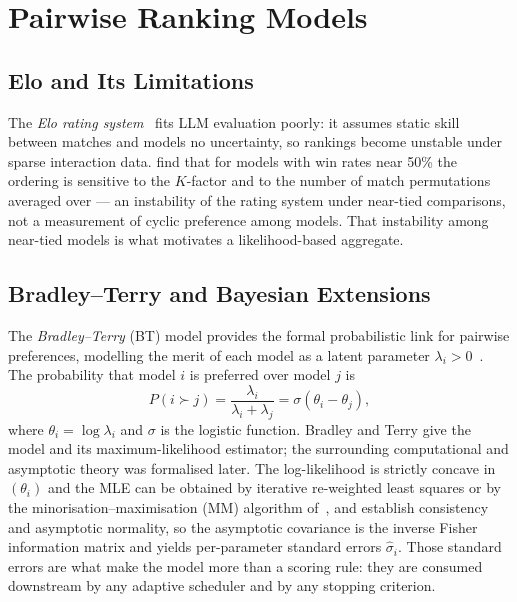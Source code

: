 \section{Pairwise Ranking Models}\label{sec:ranking-models}

\subsection*{Elo and Its Limitations}

The \textit{Elo rating system}~\parencite{elo1978rating} fits LLM
evaluation poorly: it assumes static skill between matches and models
no uncertainty, so rankings become unstable under sparse interaction
data. \textcite{boubdir2024elo} find that for models with win rates
near 50\% the ordering is sensitive to the $K$-factor and to the
number of match permutations averaged over --- an instability of the
rating system under near-tied comparisons, not a measurement of
cyclic preference among models. That instability among near-tied
models is what motivates a likelihood-based aggregate.

\subsection*{Bradley--Terry and Bayesian Extensions}

The \textit{Bradley--Terry} (BT) model provides the formal
probabilistic link for pairwise preferences, modelling the merit of
each model as a latent parameter
$\lambda_i > 0$~\parencite{bradley1952rank}. The probability that
model $i$ is preferred over model $j$ is
\begin{equation}
    P(i \succ j) = \frac{\lambda_i}{\lambda_i + \lambda_j}
    = \sigma(\theta_i - \theta_j),
    \label{eq:bt}
\end{equation}
where $\theta_i = \log \lambda_i$ and $\sigma$ is the logistic
function. Bradley and Terry give the model and its maximum-likelihood
estimator; the surrounding computational and asymptotic theory was
formalised later. The log-likelihood is strictly concave in
$(\theta_i)$ and the MLE can be obtained by iterative re-weighted
least squares or by the minorisation--maximisation (MM) algorithm
of~\textcite{hunter2004mm}, and \textcite{simons1999asymptotics}
establish consistency and asymptotic normality, so the asymptotic
covariance is the inverse Fisher information matrix and yields
per-parameter standard errors $\hat{\sigma}_i$. Those standard errors
are what make the model more than a scoring rule: they are consumed
downstream by any adaptive scheduler and by any stopping criterion.

